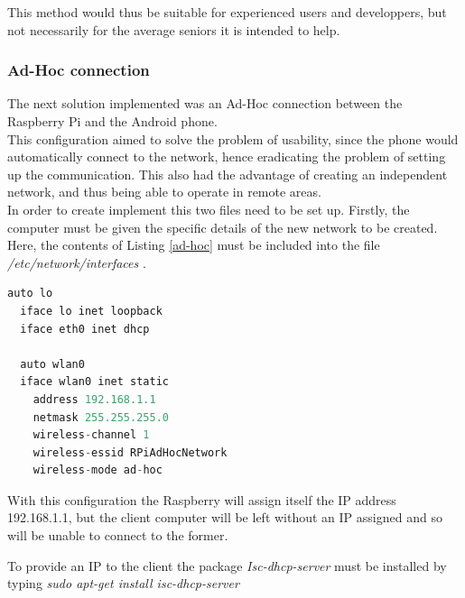 This method would thus be suitable for experienced users and developpers, but not necessarily for the average seniors it is intended to help.







\subsubsection{Ad-Hoc connection}

The next solution implemented was an Ad-Hoc connection between the Raspberry Pi and the Android phone.\\

This configuration aimed to solve the problem of usability, since the phone would automatically connect to the network, hence eradicating the problem of setting up the communication.  This also had the advantage of creating an independent network, and thus being able to operate in remote areas. \\

In order to create implement this two files need to be set up. Firstly, the computer must be given the specific details of the new network to be created. Here, the contents of Listing \ref{ad-hoc} must be included into the file \textit{/etc/network/interfaces} . \\

	\begin{minipage}{\linewidth}%
	\begin{lstlisting}[label=ad-hoc,caption=Ad-Hoc Configuration {[} /etc/network/interfaces {]} ,language=python ]
  auto lo
  iface lo inet loopback
  iface eth0 inet dhcp
 
  auto wlan0
  iface wlan0 inet static
    address 192.168.1.1
    netmask 255.255.255.0
    wireless-channel 1
    wireless-essid RPiAdHocNetwork
    wireless-mode ad-hoc
	\end{lstlisting}
	\end{minipage}

\bigskip
With this configuration the Raspberry will assign itself the IP address 192.168.1.1, but the client computer will be left without an IP assigned and so will be unable to connect to the former. 

To provide an IP to the client the package \textit{Isc-dhcp-server} must be installed by typing \textit{sudo apt-get install isc-dhcp-server}


